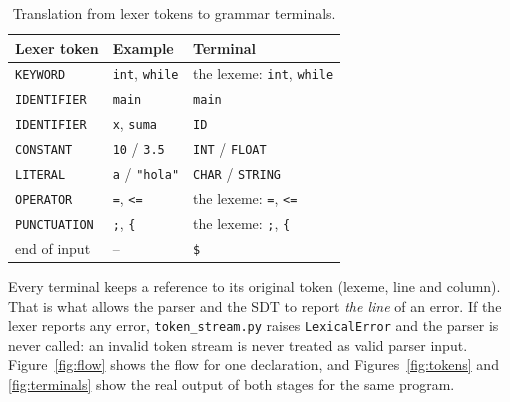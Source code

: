 \documentclass[11pt,letterpaper]{article}
\newcommand{\tok}[1]{\texttt{#1}}
\begin{document}
\begin{table}[!htbp]
\centering
\caption{Translation from lexer tokens to grammar terminals.}
\label{tab:map}
\begin{tabular}{@{}lll@{}}
\toprule
\textbf{Lexer token} & \textbf{Example} & \textbf{Terminal} \\
\midrule
\tok{KEYWORD}     & \texttt{int}, \texttt{while}   & the lexeme: \tok{int}, \tok{while} \\
\tok{IDENTIFIER}  & \texttt{main}                  & \tok{main} \\
\tok{IDENTIFIER}  & \texttt{x}, \texttt{suma}      & \tok{ID} \\
\tok{CONSTANT}    & \texttt{10} / \texttt{3.5}     & \tok{INT} / \tok{FLOAT} \\
\tok{LITERAL}     & \texttt{\textquotesingle{}a\textquotesingle{}} / \texttt{"hola"} & \tok{CHAR} / \tok{STRING} \\
\tok{OPERATOR}    & \texttt{=}, \texttt{<=}        & the lexeme: \tok{=}, \tok{<=} \\
\tok{PUNCTUATION} & \texttt{;}, \texttt{\{}        & the lexeme: \tok{;}, \tok{\{} \\
end of input      & --                             & \tok{\$} \\
\bottomrule
\end{tabular}
\end{table}

Every terminal keeps a reference to its original token (lexeme, line and
column). That is what allows the parser and the SDT to report \emph{the line}
of an error. If the lexer reports any error, \texttt{token\_stream.py} raises
\texttt{LexicalError} and the parser is never called: an invalid token stream
is never treated as valid parser input. Figure~\ref{fig:flow} shows the flow
for one declaration, and Figures~\ref{fig:tokens} and \ref{fig:terminals}
show the real output of both stages for the same program.
\end{document}
